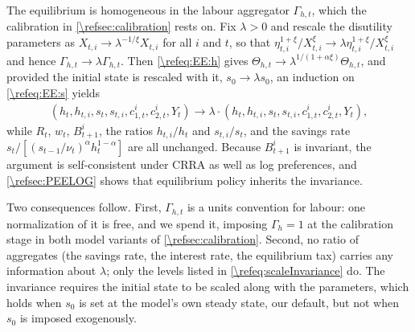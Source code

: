The equilibrium is homogeneous in the labour aggregator $\Gamma_{h,t}$, which the calibration in \cref{\refsec:calibration} rests on. Fix $\lambda>0$ and rescale the disutility parameters as $X_{t,i}\rightarrow \lambda^{-1/\xi}X_{t,i}$ for all $i$ and $t$, so that $\eta_{t,i}^{1+\xi}/X_{t,i}^{\xi}\rightarrow \lambda\eta_{t,i}^{1+\xi}/X_{t,i}^{\xi}$ and hence $\Gamma_{h,t}\rightarrow\lambda\Gamma_{h,t}$. Then \eqref{\refeq:EE:h} gives $\Theta_{h,t}\rightarrow \lambda^{1/(1+\alpha\xi)}\Theta_{h,t}$, and provided the initial state is rescaled with it, $s_0\rightarrow\lambda s_0$, an induction on \eqref{\refeq:EE:s} yields
\begin{align}\label{\refeq:scaleInvariance}
    \left(h_t, h_{t,i}, s_t, s_{t,i}, c_{1,t}^i, c_{2,t}^i, Y_t\right)\rightarrow \lambda\cdot\left(h_t, h_{t,i}, s_t, s_{t,i}, c_{1,t}^i, c_{2,t}^i, Y_t\right),
\end{align}
while $R_t$, $w_t$, $B_{t+1}^i$, the ratios $h_{t,i}/h_t$ and $s_{t,i}/s_t$, and the savings rate $s_t/\left[(s_{t-1}/\nu_t)^{\alpha}h_t^{1-\alpha}\right]$ are all unchanged. Because $B_{t+1}^i$ is invariant, the argument is self-consistent under CRRA as well as log preferences, and \cref{\refsec:PEELOG} shows that equilibrium policy inherits the invariance.

Two consequences follow. First, $\Gamma_{h,t}$ is a units convention for labour: one normalization of it is free, and we spend it, imposing $\Gamma_h = 1$ at the calibration stage in both model variants of \cref{\refsec:calibration}. Second, no ratio of aggregates (the savings rate, the interest rate, the equilibrium tax) carries any information about $\lambda$; only the levels listed in \eqref{\refeq:scaleInvariance} do. The invariance requires the initial state to be scaled along with the parameters, which holds when $s_0$ is set at the model's own steady state, our default, but not when $s_0$ is imposed exogenously.


